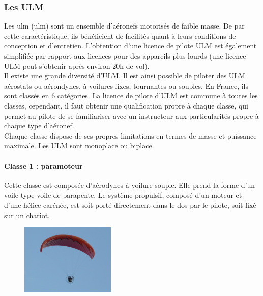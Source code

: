 \subsubsection{Les ULM}

Les \acrshort{ulm} (\acrlong{ulm})  sont un ensemble d'aéronefs motorisés de faible masse. De par cette caractéristique, ils bénéficient de facilités quant à leurs conditions de conception et d'entretien. L'obtention d'une licence de pilote ULM est également simplifiée par rapport aux licences pour des appareils plus lourds (une licence ULM peut s'obtenir après environ 20h de vol). \\

Il existe une grande diversité d'ULM. Il est ainsi possible de piloter des ULM aérostats ou aérondynes, à voilures fixes, tournantes ou souples. En France, ils sont classés en 6 catégories. La licence de pilote d'ULM est commune à toutes les classes, cependant, il faut obtenir une qualification propre à chaque classe, qui permet au pilote de se familiariser avec un instructeur aux particularités propre à chaque type d'aéronef. \\

Chaque classe dispose de ses propres limitations en termes de masse et puissance maximale. Les ULM sont monoplace ou biplace.

	\paragraph{Classe 1 : paramoteur}

	Cette classe est composée d'aérodynes à voilure souple. Elle prend la forme d'un voile type voile de parapente. Le système propulsif, composé d'un moteur et d'une hélice carénée, est soit porté directement dans le dos par le pilote, soit fixé sur un chariot.  
	
	\begin{figure}[H]
  	\centering
    \includegraphics[width=0.4\textwidth]{01-EtudeAeronefs/img/ULM_Classe_1.jpg}
	\end{figure}	
	
